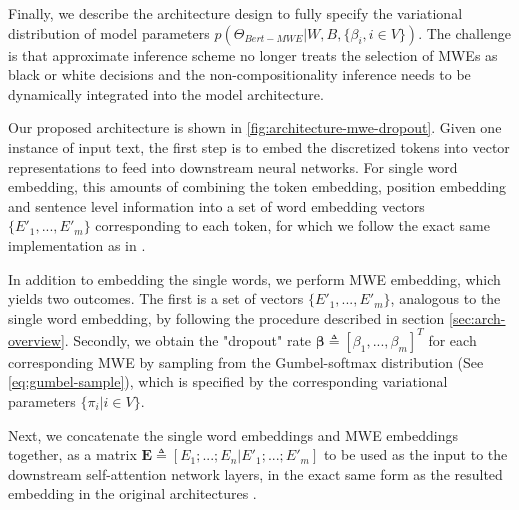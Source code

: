 Finally, we describe the architecture design to fully specify the  variational distribution of model parameters $p(\Theta_{Bert-MWE} \vert W, B, \{\beta_i, i \in V\})$. 
The challenge is that approximate inference scheme no longer treats the selection of MWEs as black or white decisions and the non-compositionality inference needs to be dynamically integrated into the model architecture. 




Our proposed architecture is shown in \autoref{fig:architecture-mwe-dropout}. 
Given one instance of input text, the first step is to embed the discretized tokens into vector representations to feed into downstream neural networks.
For single word embedding, this amounts of combining the token embedding, position embedding and sentence level information into 
a set of word embedding vectors $\{E'_1, ..., E'_m\}$ corresponding to each token, for which we follow the exact same implementation as in \cite{devlin2018bert}.

In addition to embedding the single words, 
we perform MWE embedding, which yields two outcomes.
The first is a set of vectors $\{E'_1, ..., E'_m\}$, analogous to the single word embedding, 
by following the procedure described in section \autoref{sec:arch-overview}. 
Secondly, we obtain the "dropout" rate $\bm{\beta} \triangleq [\beta_1, ..., \beta_m]^T$ for each corresponding MWE 
by sampling from the Gumbel-softmax distribution (See \autoref{eq:gumbel-sample}), which is specified by the corresponding variational parameters $\{\pi_i \vert i \in V\}$.



Next, we concatenate the single word embeddings and MWE embeddings together, as
a matrix $\mathbf{E} \triangleq [E_1; ...; E_n| E'_1; ...; E'_m]$ to be used as the input to the downstream self-attention network layers, 
in the exact same form as the resulted embedding in the original architectures
\cite{vaswani2017attention}.




